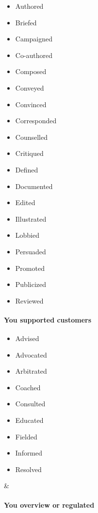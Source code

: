 \documentclass{article}
\begin{document}
\begin{longtable}
\begin{minipage}[t]{0.47\columnwidth}
\begin{itemize}
\item
  Authored
\item
  Briefed
\item
  Campaigned
\item
  Co-authored
\item
  Composed
\item
  Conveyed
\item
  Convinced
\item
  Corresponded
\item
  Counselled
\item
  Critiqued
\item
  Defined
\item
  Documented
\item
  Edited
\item
  Illustrated
\item
  Lobbied
\item
  Persuaded
\item
  Promoted
\item
  Publicized
\item
  Reviewed
\end{itemize}\strut
\end{minipage}\tabularnewline
\begin{minipage}[t]{0.47\columnwidth}\raggedright
\hypertarget{you-supported-customers}{%
\paragraph{You supported customers}\label{you-supported-customers}}

\begin{itemize}
\item
  Advised
\item
  Advocated
\item
  Arbitrated
\item
  Coached
\item
  Consulted
\item
  Educated
\item
  Fielded
\item
  Informed
\item
  Resolved
\end{itemize}\strut
\end{minipage} & \begin{minipage}[t]{0.47\columnwidth}\raggedright
\hypertarget{you-overview-or-regulated}{%
\paragraph{You overview or regulated}\label{you-overview-or-regulated}}


\end{minipage}
\end{longtable}
\end{document}

